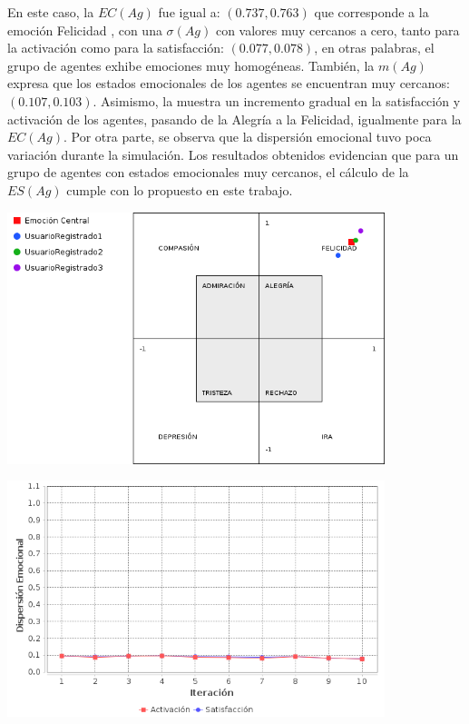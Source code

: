 En este caso, la $EC(Ag)$ fue igual a: $(0.737, 0.763)$ que corresponde a la emoción Felicidad ,
con una $\sigma(Ag)$ con valores muy cercanos
a cero, tanto para la activación como para la satisfacción: $(0.077, 0.078)$,
en otras palabras, el grupo de agentes exhibe emociones muy homogéneas.
También, la $m(Ag)$ expresa que los estados emocionales
de los agentes se encuentran muy cercanos: $(0.107, 0.103)$.
Asimismo, la  muestra un incremento
gradual en la satisfacción y activación de los agentes, pasando de la
Alegría a la Felicidad, igualmente para la $EC(Ag)$. Por otra parte, se observa que la
dispersión emocional tuvo poca variación 
durante la simulación.
Los resultados obtenidos evidencian que para un grupo
de agentes con estados emocionales muy cercanos, el cálculo de la $ES(Ag)$
cumple con lo propuesto en este trabajo.

\begin{ilustracion}[fuente=\yo, etiqueta=emocion-central-final-caso1escenario1, titulo={Emoción Central Final ($EC(Ag)$), Caso de Estudio 1 Escenario 1}]
\includegraphics[width=11cm]{ilustraciones/resultados/caso1escenario1-emocioncentral.png}
\end{ilustracion}

\begin{ilustracion}[fuente=\yo, etiqueta=dispersion-emocional-final-caso1escenario1, titulo={Evolución de la Dispersión Emocional ($\sigma(Ag)$), Caso de Estudio 1 Escenario 1}]
\includegraphics[width=11cm]{ilustraciones/resultados/caso1escenario1-dispersionemocional.png}
\end{ilustracion}

